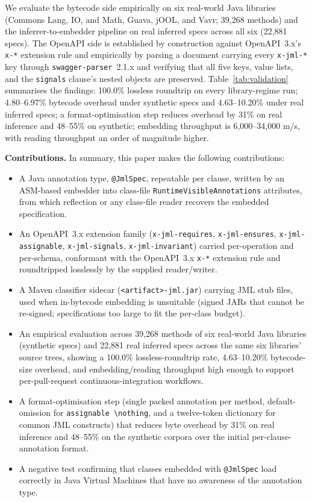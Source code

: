 We evaluate the bytecode side empirically on six real-world Java libraries (Commons Lang, IO, and Math, Guava, jOOL, and Vavr; 39{,}268 methods) and the inferrer-to-embedder pipeline on real inferred specs across all six (22{,}881 specs). The OpenAPI side is established by construction against OpenAPI~3.x's \texttt{x-*} extension rule and empirically by parsing a document carrying every \texttt{x-jml-*} key through \texttt{swagger-parser}~2.1.x and verifying that all five keys, value lists, and the \texttt{signals} clause's nested objects are preserved. Table~\ref{tab:validation} summarises the findings: 100.0\% lossless roundtrip on every library-regime run; 4.80--6.97\% bytecode overhead under synthetic specs and 4.63--10.20\% under real inferred specs; a format-optimisation step reduces overhead by 31\% on real inference and 48--55\% on synthetic; embedding throughput is 6{,}000--34{,}000 m/s, with reading throughput an order of magnitude higher.

\textbf{Contributions.} In summary, this paper makes the following contributions:

\begin{itemize}\setlength\itemsep{0.2em}
  \item A Java annotation type, \texttt{@JmlSpec}, repeatable per clause, written by an ASM-based embedder into class-file \texttt{RuntimeVisibleAnnotations} attributes, from which reflection or any class-file reader recovers the embedded specification.
  \item An OpenAPI~3.x extension family (\texttt{x-jml-requires}, \texttt{x-jml-ensures}, \texttt{x-jml-assignable}, \texttt{x-jml-signals}, \texttt{x-jml-invariant}) carried per-operation and per-schema, conformant with the OpenAPI~3.x \texttt{x-*} extension rule and roundtripped losslessly by the supplied reader/writer.
  \item A Maven classifier sidecar (\texttt{<artifact>-jml.jar}) carrying JML stub files, used when in-bytecode embedding is unsuitable (signed JARs that cannot be re-signed; specifications too large to fit the per-class budget).
  \item An empirical evaluation across 39{,}268 methods of six real-world Java libraries (synthetic specs) and 22{,}881 real inferred specs across the same six libraries' source trees, showing a 100.0\% lossless-roundtrip rate, 4.63--10.20\% bytecode-size overhead, and embedding/reading throughput high enough to support per-pull-request continuous-integration workflows.
  \item A format-optimisation step (single packed annotation per method, default-omission for \texttt{assignable \textbackslash nothing}, and a twelve-token dictionary for common JML constructs) that reduces byte overhead by 31\% on real inference and 48--55\% on the synthetic corpora over the initial per-clause-annotation format.
  \item A negative test confirming that classes embedded with \texttt{@JmlSpec} load correctly in Java Virtual Machines that have no awareness of the annotation type.
\end{itemize}

